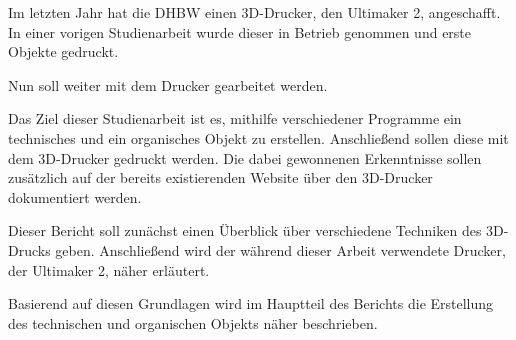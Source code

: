 
Im letzten Jahr hat die \ac{DHBW} einen \ac{3D}-Drucker, den Ultimaker 2, angeschafft. In einer vorigen Studienarbeit wurde dieser in Betrieb genommen und erste Objekte gedruckt.
 
Nun soll weiter mit dem Drucker gearbeitet werden.
 
Das Ziel dieser Studienarbeit ist es, mithilfe verschiedener Programme ein technisches und ein organisches Objekt zu erstellen. Anschließend sollen diese mit dem \ac{3D}-Drucker gedruckt werden. 
Die dabei gewonnenen Erkenntnisse sollen zusätzlich auf der bereits existierenden Website über den \ac{3D}-Drucker dokumentiert werden. 
 
Dieser Bericht soll zunächst einen Überblick über verschiedene Techniken des \ac{3D}-Drucks geben. Anschließend wird der während dieser Arbeit verwendete Drucker, der Ultimaker 2, näher erläutert.
 
Basierend auf diesen Grundlagen wird im Hauptteil des Berichts die Erstellung des technischen und organischen Objekts näher beschrieben. 